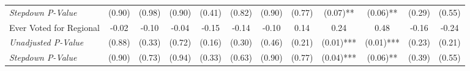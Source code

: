 \begin{tabular}{l c c c c c c c c c c c}
\quad \textit{Stepdown P-Value} & (0.90) & (0.98) & (0.90) & (0.41) & (0.82) & (0.90) & (0.77) & (0.07)** & (0.06)** & (0.29) & (0.55) \\
Ever Voted for Regional & -0.02 & -0.10 & -0.04 & -0.15 & -0.14 & -0.10 & 0.14 & 0.24 & 0.48 & -0.16 & -0.24 \\
\quad \textit{Unadjusted P-Value} & (0.88) & (0.33) & (0.72) & (0.16) & (0.30) & (0.46) & (0.21) & (0.01)*** & (0.01)*** & (0.23) & (0.21) \\
\quad \textit{Stepdown P-Value} & (0.90) & (0.73) & (0.94) & (0.33) & (0.63) & (0.90) & (0.77) & (0.04)*** & (0.06)** & (0.39) & (0.55) \\
\bottomrule
\end{tabular}

